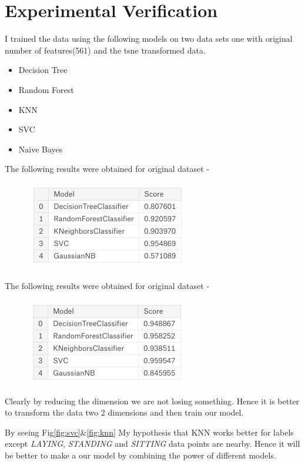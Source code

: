\documentclass[12pt]{article}
\begin{document}
\section{Experimental Verification}
I trained the data using the following models on two data sets one with original number of features(561) and the tsne transformed data.
\begin{itemize}
	\item Decision Tree
	\item Random Forest
	\item KNN
	\item SVC
	\item Naive Bayes
\end{itemize}
The following results were obtained for original dataset - \\
	\begin{figure}[H]
			\centering
			\includegraphics[scale=0.75]{model1.png}
		\end{figure}
\vspace{0.5cm}		
\noindent
The following results were obtained for original dataset - \\
	\begin{figure}[H]
			\centering
			\includegraphics[scale=0.75]{model2.png}
		\end{figure}
\vspace{0.5cm}
Clearly by reducing the dimension we are not losing something. Hence it is better to transform the data two 2 dimensions and then train our model.

By seeing Fig\ref{fig:svc}$\&$\ref{fig:knn} My hypothesis that KNN works better for labels except \textit{LAYING}, \textit{STANDING} and \textit{SITTING} data points are nearby. Hence it will be better to make a our model by combining the power of different models.
\end{document}
